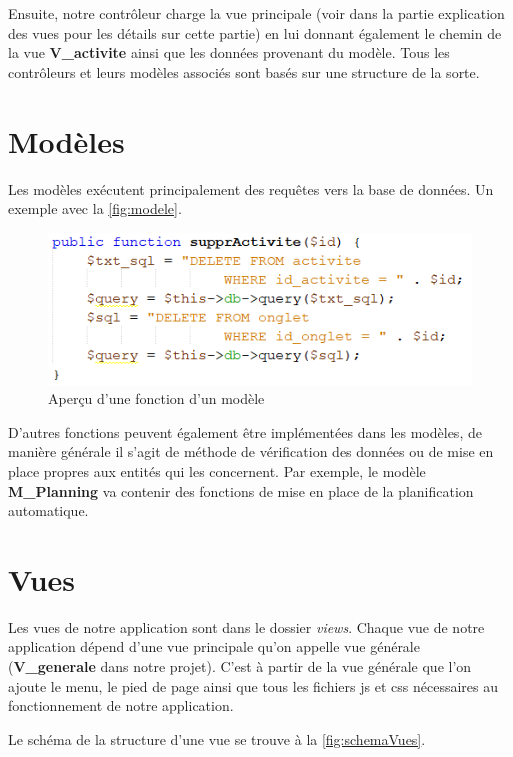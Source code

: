 \documentclass{polytech/polytech}
\begin{document}
Ensuite, notre contrôleur charge la vue principale (voir dans la partie explication des vues pour les détails sur cette partie) en lui donnant également le chemin de la vue \textbf{V\_activite} ainsi que les données provenant du modèle. Tous les contrôleurs et leurs modèles associés sont basés sur une structure de la sorte.

\section{Modèles}

Les modèles exécutent principalement des requêtes vers la base de données. Un exemple avec la \autoref{fig:modele}.

\begin{figure}
	\includegraphics[scale=1]{images/modele}
	\caption{Aperçu d'une fonction d'un modèle}
	\label{fig:modele}
\end{figure}

D'autres fonctions peuvent également être implémentées dans les modèles, de manière générale il s'agit de méthode de vérification des données ou de mise en place propres aux entités qui les concernent. Par exemple, le modèle \textbf{M\_Planning} va contenir des fonctions de mise en place de la planification automatique.


\section{Vues}

Les vues de notre application sont dans le dossier \textit{views}. Chaque vue de notre application dépend d'une vue principale qu'on appelle vue générale (\textbf{V\_generale} dans notre projet). C'est à partir de la vue générale que l'on ajoute le menu, le pied de page ainsi que tous les fichiers js et css nécessaires au fonctionnement de notre application. 

Le schéma de la structure d'une vue se trouve à la \autoref{fig:schemaVues}.
\end{document}
